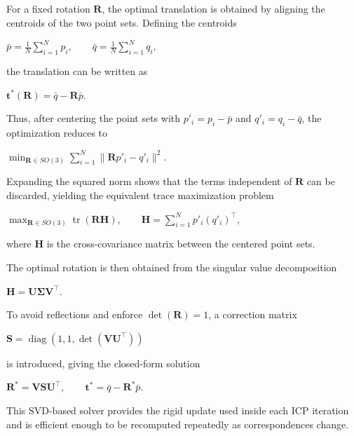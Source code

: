 For a fixed rotation $\mathbf{R}$, the optimal translation is obtained by aligning the centroids of the two point sets. Defining the centroids
\begin{center}
    $\displaystyle \bar p = \frac{1}{N}\sum_{i=1}^{N} p_i,\qquad \bar q = \frac{1}{N}\sum_{i=1}^{N} q_i,$
\end{center}
the translation can be written as
\begin{center}
    $\displaystyle \mathbf{t}^*(\mathbf{R}) = \bar q - \mathbf{R}\bar p.$
\end{center}
Thus, after centering the point sets with $p'_i = p_i-\bar p$ and $q'_i = q_i-\bar q$, the optimization reduces to
\begin{center}
    $\displaystyle \min_{\mathbf{R}\in SO(3)} \sum_{i=1}^{N}\|\mathbf{R}p'_i-q'_i\|^2.$
\end{center}
Expanding the squared norm shows that the terms independent of $\mathbf{R}$ can be discarded, yielding the equivalent trace maximization problem
\begin{center}
    $\displaystyle \max_{\mathbf{R}\in SO(3)} \operatorname{tr}(\mathbf{R}\mathbf{H}),\qquad \mathbf{H}=\sum_{i=1}^{N} p'_i (q'_i)^\top,$
\end{center}
where $\mathbf{H}$ is the cross-covariance matrix between the centered point sets.

The optimal rotation is then obtained from the singular value decomposition
\begin{center}
    $\displaystyle \mathbf{H}=\mathbf{U}\mathbf{\Sigma}\mathbf{V}^\top.$
\end{center}
To avoid reflections and enforce $\det(\mathbf{R})=1$, a correction matrix
\begin{center}
    $\displaystyle \mathbf{S}=\operatorname{diag}(1,1,\det(\mathbf{V}\mathbf{U}^\top))$
\end{center}
is introduced, giving the closed-form solution
\begin{center}
    $\displaystyle \mathbf{R}^*=\mathbf{V}\mathbf{S}\mathbf{U}^\top,\qquad \mathbf{t}^*=\bar q-\mathbf{R}^*\bar p.$
\end{center}
This SVD-based solver provides the rigid update used inside each ICP iteration and is efficient enough to be recomputed repeatedly as correspondences change.

